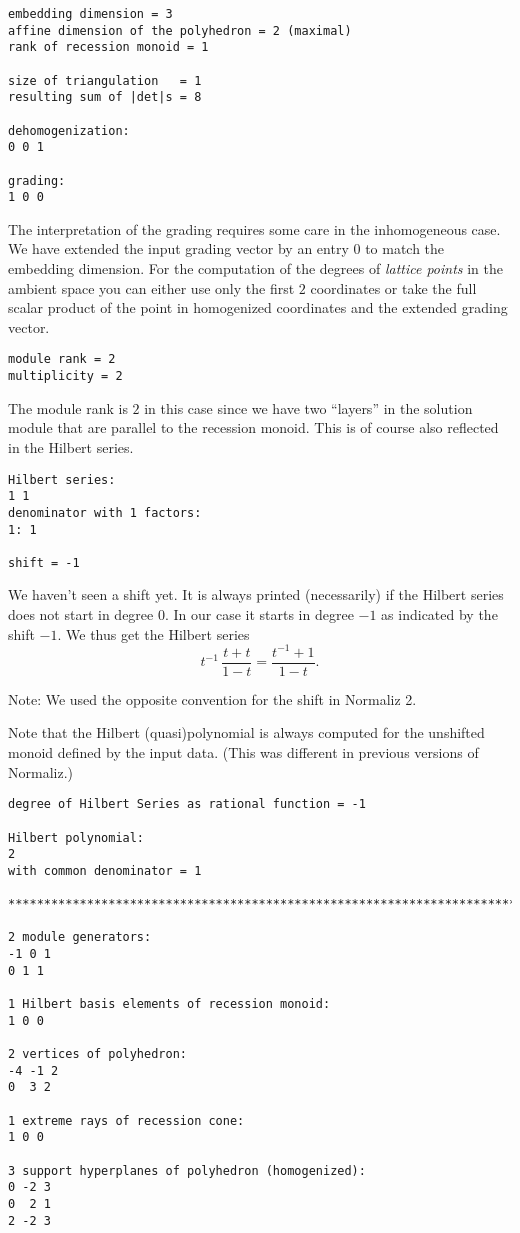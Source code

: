 \documentclass[12pt,a4paper]{scrartcl}
\theoremstyle{definition}
\begin{document}
\begin{Verbatim}
embedding dimension = 3
affine dimension of the polyhedron = 2 (maximal)
rank of recession monoid = 1

size of triangulation   = 1
resulting sum of |det|s = 8

dehomogenization:
0 0 1 

grading:
1 0 0 
\end{Verbatim}
The interpretation of the grading requires some care in the inhomogeneous case. We have extended the input grading vector by an entry $0$ to match the embedding dimension. For the computation of the degrees of \emph{lattice points} in the ambient space you can either use only the first $2$ coordinates or take the full scalar product of the point in homogenized coordinates and the extended grading vector.

\begin{Verbatim}
module rank = 2
multiplicity = 2
\end{Verbatim}
The module rank is $2$ in this case since we have two ``layers'' in the solution module that are parallel to the recession monoid. This is of course also reflected in the Hilbert series.
\begin{Verbatim}
Hilbert series:
1 1 
denominator with 1 factors:
1: 1  

shift = -1
\end{Verbatim}
We haven't seen a shift yet. It is always printed (necessarily) if the Hilbert series does not start in degree $0$. In our case it starts in degree $-1$ as indicated by the shift $-1$. We thus get the Hilbert series
$$
t^{-1}\,\frac{t+t}{1-t}=\frac{t^{-1}+1}{1-t}.
$$

Note: We used the opposite convention for the shift in Normaliz 2.

Note that the Hilbert (quasi)polynomial is always computed for the unshifted monoid defined by the input data. (This was different in previous versions of Normaliz.) 
\begin{Verbatim}
degree of Hilbert Series as rational function = -1

Hilbert polynomial:
2 
with common denominator = 1

***********************************************************************

2 module generators:
-1 0 1
0 1 1

1 Hilbert basis elements of recession monoid:
1 0 0

2 vertices of polyhedron:
-4 -1 2
0  3 2

1 extreme rays of recession cone:
1 0 0

3 support hyperplanes of polyhedron (homogenized):
0 -2 3
0  2 1
2 -2 3
\end{Verbatim}
\end{document}
